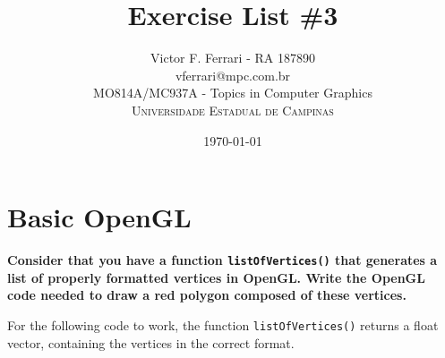 \documentclass[12pt]{article}
\title{Exercise List \#3} %
\author{Victor F. Ferrari - RA 187890\\ %
vferrari@mpc.com.br\\
MO814A/MC937A - Topics in Computer Graphics\\ %
\textsc{Universidade Estadual de Campinas}
}
\date{\today} %
\begin{document}
\setlength{\droptitle}{-5em}    
\maketitle


\section{Basic OpenGL}
{\bfseries Consider that you have a function \texttt{listOfVertices()} that generates a list of properly formatted vertices in OpenGL. Write the OpenGL code needed to draw a red polygon composed of these vertices.}

For the following code to work, the function \texttt{listOfVertices()} returns a float vector, containing the vertices in the correct format.
\end{document}
